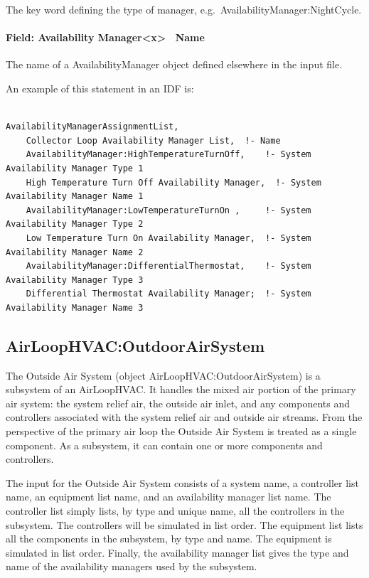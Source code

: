 The key word defining the type of manager, e.g.~AvailabilityManager:NightCycle.

\paragraph{Field: Availability Manager\textless{}x\textgreater{}~ Name}\label{field-availability-managerx-name}

The name of a AvailabilityManager object defined elsewhere in the input file.

An example of this statement in an IDF is:

\begin{lstlisting}

AvailabilityManagerAssignmentList,
    Collector Loop Availability Manager List,  !- Name
    AvailabilityManager:HighTemperatureTurnOff,    !- System Availability Manager Type 1
    High Temperature Turn Off Availability Manager,  !- System Availability Manager Name 1
    AvailabilityManager:LowTemperatureTurnOn ,     !- System Availability Manager Type 2
    Low Temperature Turn On Availability Manager,  !- System Availability Manager Name 2
    AvailabilityManager:DifferentialThermostat,    !- System Availability Manager Type 3
    Differential Thermostat Availability Manager;  !- System Availability Manager Name 3
\end{lstlisting}

\subsection{AirLoopHVAC:OutdoorAirSystem}\label{airloophvacoutdoorairsystem}

The Outside Air System (object AirLoopHVAC:OutdoorAirSystem) is a subsystem of an AirLoopHVAC. It handles the mixed air portion of the primary air system: the system relief air, the outside air inlet, and any components and controllers associated with the system relief air and outside air streams. From the perspective of the primary air loop the Outside Air System is treated as a single component. As a subsystem, it can contain one or more components and controllers.

The input for the Outside Air System consists of a system name, a controller list name, an equipment list name, and an availability manager list name. The controller list simply lists, by type and unique name, all the controllers in the subsystem. The controllers will be simulated in list order. The equipment list lists all the components in the subsystem, by type and name. The equipment is simulated in list order. Finally, the availability manager list gives the type and name of the availability managers used by the subsystem.


